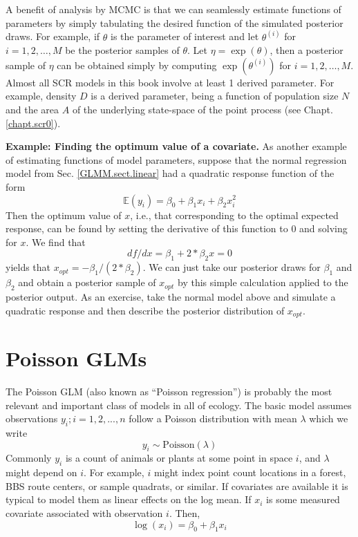 A benefit of analysis by MCMC is that we can seamlessly estimate
functions of parameters by simply tabulating the desired function of
the simulated posterior draws. For example, if $\theta$ is the
parameter of interest and let $\theta^{(i)}$ for $i=1,2,\ldots,M$ be
the posterior samples of $\theta$. Let $\eta = \exp(\theta)$, then a
posterior sample of $\eta$ can be obtained simply by computing
$\exp(\theta^{(i)})$ for $i=1,2,\ldots,M$. 
Almost all SCR models in this book involve at least 1 derived
parameter. For example, density $D$ is a derived parameter, being a
function of population size $N$ and the area $A$ of the underlying
state-space of the point process (see Chapt. \ref{chapt.scr0}).

{\bf Example: Finding the optimum value of a covariate.}
As another example of estimating functions of model parameters, suppose that the
normal regression model from Sec. \ref{GLMM.sect.linear} had a quadratic response function of the
form
\[
	\mathbb{E}(y_i) = \beta_0 + \beta_1 x_i + \beta_2 x_{i}^{2}
\]
Then the optimum value of $x$, i.e., that corresponding to the optimal
expected response, can be found by setting the derivative of
this function to 0 and solving for $x$. We find that
\[
df/dx = \beta_1 +
2*\beta_2 x = 0
\]
yields that $x_{opt} = -\beta_1/(2*\beta_2)$.  We can just
take our posterior draws for $\beta_1$ and $\beta_2$ and obtain a
posterior sample of $x_{opt}$ by this simple calculation applied to
the posterior output. As an exercise, take
the normal model above and simulate a quadratic response and then
describe the posterior distribution of $x_{opt}$.


\section{Poisson GLMs}
\label{glms.sec.poisson}

The Poisson GLM (also known as ``Poisson regression'') is probably the
most relevant and important class of models in all of ecology. The
basic model assumes observations $y_{i}; i=1,2,...,n$ follow a Poisson
distribution with mean $\lambda$ which we write
\[
 	y_{i} \sim \mbox{Poisson}(\lambda)
\]
Commonly $y_{i}$ is a count of animals or plants at some point in
space $i$, and $\lambda$ might depend on $i$. For example, $i$ might index point
count locations in a forest, BBS route centers, or sample quadrats, or
similar.  If covariates are available it is typical to model them as
linear effects on the log mean. If $x_i$ is some measured covariate
associated with observation $i$. Then,
\[
 	\log(x_i) = \beta_0  + \beta_1 x_i
\]

